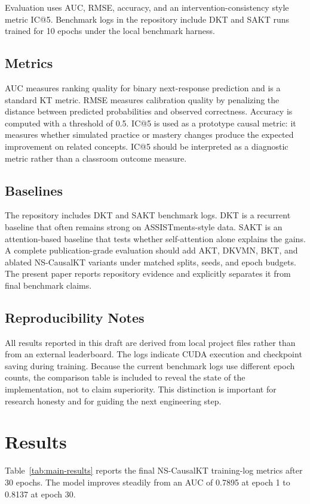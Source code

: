 \documentclass[conference]{IEEEtran}
\begin{document}
Evaluation uses AUC, RMSE, accuracy, and an intervention-consistency style metric IC@5. Benchmark logs in the repository include DKT and SAKT runs trained for 10 epochs under the local benchmark harness.

\subsection{Metrics}
AUC measures ranking quality for binary next-response prediction and is a standard KT metric. RMSE measures calibration quality by penalizing the distance between predicted probabilities and observed correctness. Accuracy is computed with a threshold of 0.5. IC@5 is used as a prototype causal metric: it measures whether simulated practice or mastery changes produce the expected improvement on related concepts. IC@5 should be interpreted as a diagnostic metric rather than a classroom outcome measure.

\subsection{Baselines}
The repository includes DKT and SAKT benchmark logs. DKT is a recurrent baseline that often remains strong on ASSISTments-style data. SAKT is an attention-based baseline that tests whether self-attention alone explains the gains. A complete publication-grade evaluation should add AKT, DKVMN, BKT, and ablated NS-CausalKT variants under matched splits, seeds, and epoch budgets. The present paper reports repository evidence and explicitly separates it from final benchmark claims.

\subsection{Reproducibility Notes}
All results reported in this draft are derived from local project files rather than from an external leaderboard. The logs indicate CUDA execution and checkpoint saving during training. Because the current benchmark logs use different epoch counts, the comparison table is included to reveal the state of the implementation, not to claim superiority. This distinction is important for research honesty and for guiding the next engineering step.

\section{Results}
Table~\ref{tab:main-results} reports the final NS-CausalKT training-log metrics after 30 epochs. The model improves steadily from an AUC of 0.7895 at epoch 1 to 0.8137 at epoch 30.
\end{document}
